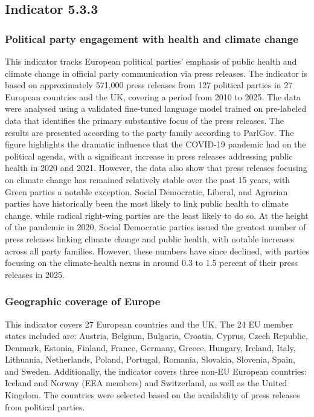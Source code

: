\documentclass[
  letterpaper,
  DIV=11,
  numbers=noendperiod]{scrartcl}
\begin{document}
\subsection{Indicator 5.3.3}\label{indicator-5.3.3}

\subsubsection{Political party engagement with health and climate
change}\label{political-party-engagement-with-health-and-climate-change}

This indicator tracks European political parties' emphasis of public
health and climate change in official party communication via press
releases. The indicator is based on approximately 571,000 press releases from
127 political parties in 27 European countries and the UK, covering a period from
2010 to 2025. The data were analysed using a validated fine-tuned
language model trained on pre-labeled data that identifies the primary
substantive focus of the press releases. The results are presented
according to the party family according to ParlGov. The figure
highlights the dramatic influence that the COVID-19 pandemic had on the
political agenda, with a significant increase in press releases
addressing public health in 2020 and 2021. However, the data also show
that press releases focusing on climate change has remained relatively
stable over the past 15 years, with Green parties a notable exception.
Social Democratic, Liberal, and Agrarian parties have
historically been the most likely to link public health to climate
change, while radical right-wing parties are the least likely to do so.
At the height of the pandemic in 2020, Social Democratic parties issued
the greatest number of press releases linking climate change and public
health, with notable increases across all party families. However, these
numbers have since declined, with parties focusing on the climate-health
nexus in around 0.3 to 1.5 percent of their press releases in 2025.

\subsubsection{Geographic coverage of
Europe}\label{geographic-coverage-of-europe}

This indicator covers 27 European countries and the UK. The 24 EU member
states included are: Austria, Belgium, Bulgaria, Croatia, Cyprus, Czech
Republic, Denmark, Estonia, Finland, France, Germany, Greece, Hungary,
Ireland, Italy, Lithuania, Netherlands, Poland, Portugal, Romania,
Slovakia, Slovenia, Spain, and Sweden. Additionally, the indicator covers
three non-EU European countries: Iceland and Norway (EEA members) and
Switzerland, as well as the United Kingdom. The countries were selected
based on the availability of press releases from political parties.
\end{document}
